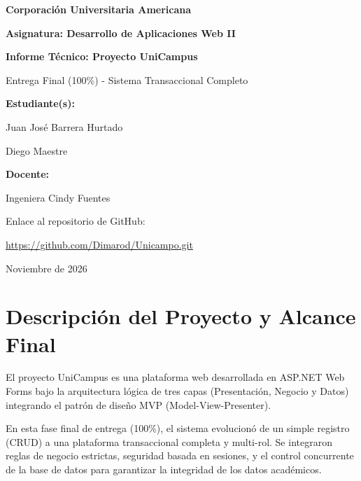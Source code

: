 \documentclass[11pt, a4paper]{article}
\begin{document}
\begin{titlepage}
    \centering
    \vspace*{2cm}
    
    {\Huge\bfseries Corporación Universitaria Americana\par}
    \vspace{1cm}
    {\Large\bfseries Asignatura: Desarrollo de Aplicaciones Web II\par}
    \vspace{2cm}
    
    {\huge\bfseries Informe Técnico: Proyecto UniCampus\par}
    {\Large Entrega Final (100\%) - Sistema Transaccional Completo\par}
    \vspace{3cm}
    
    {\Large\bfseries Estudiante(s):\par}
    {\Large Juan José Barrera Hurtado\par}
    {\Large Diego Maestre\par}
    
    \vspace{2cm}
    {\Large\bfseries Docente:\par}
    {\Large Ingeniera Cindy Fuentes\par}
    
    \vfill
    
    {\large Enlace al repositorio de GitHub:\par}
    {\normalsize \url{https://github.com/Dimarod/Unicampo.git}}\par
    
    \vspace{1cm}
    {\large Noviembre de 2026\par}
\end{titlepage}

\newpage
\tableofcontents
\newpage

\section{Descripción del Proyecto y Alcance Final}
El proyecto UniCampus es una plataforma web desarrollada en ASP.NET Web Forms bajo la arquitectura lógica de tres capas (Presentación, Negocio y Datos) integrando el patrón de diseño MVP (Model-View-Presenter). 

En esta fase final de entrega (100\%), el sistema evolucionó de un simple registro (CRUD) a una plataforma transaccional completa y multi-rol. Se integraron reglas de negocio estrictas, seguridad basada en sesiones, y el control concurrente de la base de datos para garantizar la integridad de los datos académicos.
\end{document}
